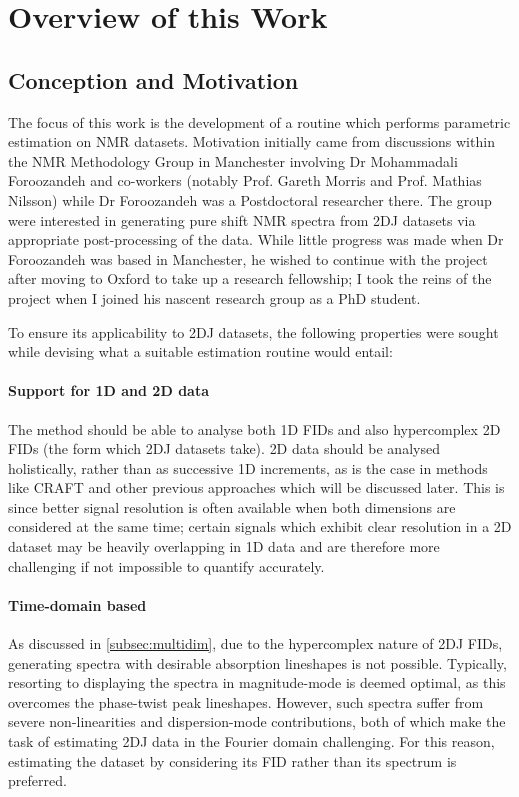 \section{Overview of this Work}

\subsection{Conception and Motivation}
The focus of this work is the development of a routine which performs
parametric estimation on \ac{NMR} datasets.
Motivation initially came from discussions within the NMR
Methodology Group in Manchester involving
Dr Mohammadali Foroozandeh and co-workers (notably Prof.  Gareth Morris and
Prof. Mathias Nilsson) while Dr Foroozandeh was a
Postdoctoral researcher there. The group were interested in generating pure
shift \ac{NMR} spectra from \ac{2DJ} datasets via appropriate post-processing
of the data.  While little progress was made when Dr Foroozandeh was based in
Manchester, he wished to continue with the project after moving to Oxford to
take up a research fellowship; I took the reins of the project when I joined
his nascent research group as a PhD student.

To ensure its applicability to \ac{2DJ} datasets, the following properties were
sought while devising what a suitable estimation routine would entail:

\paragraph{Support for \ac{1D} and \ac{2D} data}
The method should be able to analyse both \ac{1D} \acp{FID} and also
hypercomplex \ac{2D} \acp{FID} (the form which \ac{2DJ} datasets take).
\ac{2D} data should be analysed holistically,
rather than as successive \ac{1D} increments, as is the case in methods like
\ac{CRAFT}\cite{Krishnamurthy2017} and other previous approaches which will be
discussed later. This is since better signal resolution is often available when
both dimensions are considered at the same time; certain signals which exhibit
clear resolution in a \ac{2D} dataset may be heavily overlapping in \ac{1D}
data and are therefore more challenging if not impossible to quantify
accurately.

\paragraph{Time-domain based}
As discussed in \cref{subsec:multidim}, due to the hypercomplex nature of
\ac{2DJ} \acp{FID}, generating spectra with desirable absorption lineshapes is
not possible. Typically, resorting to displaying the spectra in magnitude-mode is
deemed optimal, as this overcomes the phase-twist peak lineshapes. However,
such spectra suffer from severe non-linearities and dispersion-mode
contributions, both of which make the task of estimating \ac{2DJ} data in the
Fourier domain challenging. For this reason, estimating the dataset by
considering its \ac{FID} rather than its spectrum is preferred.

